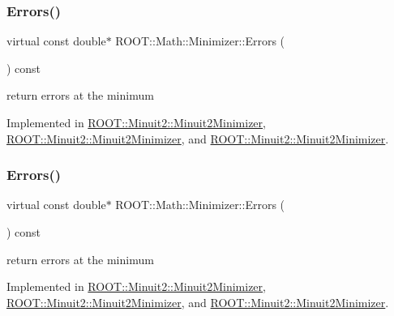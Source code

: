 \subsubsection{\texorpdfstring{Errors()}{Errors()}\hspace{0.1cm}{\footnotesize\ttfamily [2/3]}}
{\footnotesize\ttfamily virtual const double$\ast$ R\+O\+O\+T\+::\+Math\+::\+Minimizer\+::\+Errors (\begin{DoxyParamCaption}{ }\end{DoxyParamCaption}) const\hspace{0.3cm}{\ttfamily [pure virtual]}}



return errors at the minimum 



Implemented in \mbox{\hyperlink{classROOT_1_1Minuit2_1_1Minuit2Minimizer_a69c6dd9654ce41856814b358570cb9d7}{R\+O\+O\+T\+::\+Minuit2\+::\+Minuit2\+Minimizer}}, \mbox{\hyperlink{classROOT_1_1Minuit2_1_1Minuit2Minimizer_a69c6dd9654ce41856814b358570cb9d7}{R\+O\+O\+T\+::\+Minuit2\+::\+Minuit2\+Minimizer}}, and \mbox{\hyperlink{classROOT_1_1Minuit2_1_1Minuit2Minimizer_a69c6dd9654ce41856814b358570cb9d7}{R\+O\+O\+T\+::\+Minuit2\+::\+Minuit2\+Minimizer}}.

\mbox{\label{classROOT_1_1Math_1_1Minimizer_a42f71e22f16cf4c59b621cf7e1e75f3d}} 
\subsubsection{\texorpdfstring{Errors()}{Errors()}\hspace{0.1cm}{\footnotesize\ttfamily [3/3]}}
{\footnotesize\ttfamily virtual const double$\ast$ R\+O\+O\+T\+::\+Math\+::\+Minimizer\+::\+Errors (\begin{DoxyParamCaption}{ }\end{DoxyParamCaption}) const\hspace{0.3cm}{\ttfamily [pure virtual]}}



return errors at the minimum 



Implemented in \mbox{\hyperlink{classROOT_1_1Minuit2_1_1Minuit2Minimizer_a69c6dd9654ce41856814b358570cb9d7}{R\+O\+O\+T\+::\+Minuit2\+::\+Minuit2\+Minimizer}}, \mbox{\hyperlink{classROOT_1_1Minuit2_1_1Minuit2Minimizer_a69c6dd9654ce41856814b358570cb9d7}{R\+O\+O\+T\+::\+Minuit2\+::\+Minuit2\+Minimizer}}, and \mbox{\hyperlink{classROOT_1_1Minuit2_1_1Minuit2Minimizer_a69c6dd9654ce41856814b358570cb9d7}{R\+O\+O\+T\+::\+Minuit2\+::\+Minuit2\+Minimizer}}.

